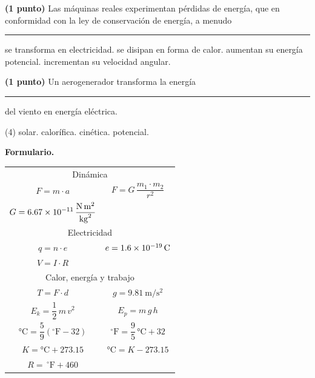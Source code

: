 \documentclass[12pt, letter]{exam}
\begin{document}
\begin{questions}
    \question \textbf{(1 punto)} Las máquinas reales experimentan pérdidas de energía, que en conformidad con la ley de conservación de energía, a menudo \rule{2cm}{0.1mm}
    \begin{multicols}{2}
    \begin{tasks}
        \task se transforma en electricidad.
        \task se disipan en forma de calor.
        \task aumentan su energía potencial.
        \task incrementan su velocidad angular.
    \end{tasks}
    \end{multicols}
    \question \textbf{(1 punto)} Un aerogenerador transforma la energía \rule{2cm}{0.1mm} del viento en energía eléctrica.
    \begin{tasks}(4)
        \task solar.
        \task calorífica.
        \task cinética.
        \task potencial.
    \end{tasks}

\end{questions}

\newpage

\vspace*{-1cm}
\textbf{\huge{Formulario.}}
\begin{table}[H]
\centering
\setlength{\tabcolsep}{40pt}
\renewcommand{\arraystretch}{1.5}
\begin{tabular}{c  c}
    \multicolumn{2}{c}{Dinámica} \\
    $F = m \cdot a$ & $F = G \, \dfrac{m_{1} \cdot m_{2}}{r^{2}}$ \\
    $G = \displaystyle \SI[per-mode=fraction]{6.67d-11}{\newton\square\meter\per\square\kilo\gram}$ &  \\ \hline
    \multicolumn{2}{c}{Electricidad} \\
    $q = n \cdot e$ & $e = \SI{1.6d-19}{\coulomb}$ \\
    $V = I \cdot R$ & \\
    \hline
    \multicolumn{2}{c}{Calor, energía y trabajo} \\
    $T = F \cdot d$ & $g = \displaystyle \SI{9.81}{\meter\per\square\second}$ \\
    $E_{k} = \dfrac{1}{2} \, m \, v^{2}$ & $E_{p} = m \, g \, h$ \\
    $\unit{\degreeCelsius} = \dfrac{5}{9} \left( ^{\circ}\text{F} - 32 \right)$ & $^{\circ}\text{F} = \dfrac{9}{5} \, \unit{\degreeCelsius} + 32$ \\
    $K = \unit{\degreeCelsius} + 273.15$ & $\unit{\degreeCelsius} = K - 273.15$ \\
    $R = \, ^{\circ}\text{F} + 460$ & \\
\end{tabular}
\end{table}
\end{document}
